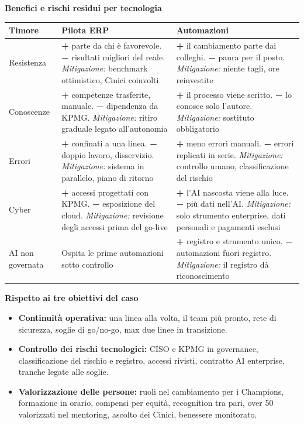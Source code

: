 \documentclass[11pt,a4paper]{article}
\begin{document}
\textbf{Benefici e rischi residui per tecnologia}

{\small\renewcommand{\arraystretch}{1.25}
\begin{xltabular}{\linewidth}{@{}>{\raggedright\arraybackslash{}\hsize\hspace{0pt}}X>{\raggedright\arraybackslash{}\hsize\hspace{0pt}}X>{\raggedright\arraybackslash{}\hsize\hspace{0pt}}X@{}}
\toprule
\textbf{Timore} & \textbf{Pilota ERP} & \textbf{Automazioni} \\
\midrule
\endhead
Resistenza & \textbf{+} parte da chi è favorevole. \textbf{−} risultati migliori del reale. \emph{Mitigazione:} benchmark ottimistico, Cinici coinvolti & \textbf{+} il cambiamento parte dai colleghi. \textbf{−} paura per il posto. \emph{Mitigazione:} niente tagli, ore reinvestite \\
Conoscenze & \textbf{+} competenze trasferite, manuale. \textbf{−} dipendenza da KPMG. \emph{Mitigazione:} ritiro graduale legato all'autonomia & \textbf{+} il processo viene scritto. \textbf{−} lo conosce solo l'autore. \emph{Mitigazione:} sostituto obbligatorio \\
Errori & \textbf{+} confinati a una linea. \textbf{−} doppio lavoro, disservizio. \emph{Mitigazione:} sistema in parallelo, piano di ritorno & \textbf{+} meno errori manuali. \textbf{−} errori replicati in serie. \emph{Mitigazione:} controllo umano, classificazione del rischio \\
Cyber & \textbf{+} accessi progettati con KPMG. \textbf{−} esposizione del cloud. \emph{Mitigazione:} revisione degli accessi prima del go-live & \textbf{+} l'AI nascosta viene alla luce. \textbf{−} più dati nell'AI. \emph{Mitigazione:} solo strumento enterprise, dati personali e pagamenti esclusi \\
AI non governata & Ospita le prime automazioni sotto controllo & \textbf{+} registro e strumento unico. \textbf{−} automazioni fuori registro. \emph{Mitigazione:} il registro dà riconoscimento \\
\bottomrule
\end{xltabular}}

\textbf{Rispetto ai tre obiettivi del caso}
\begin{itemize}
\item \textbf{Continuità operativa:} una linea alla volta, il team più pronto, rete di sicurezza, soglie di go/no-go, max due linee in transizione.
\item \textbf{Controllo dei rischi tecnologici:} CISO e KPMG in governance, classificazione del rischio e registro, accessi rivisti, contratto AI enterprise, tranche legate alle soglie.
\item \textbf{Valorizzazione delle persone:} ruoli nel cambiamento per i Champions, formazione in orario, compensi per equità, recognition tra pari, over 50 valorizzati nel mentoring, ascolto dei Cinici, benessere monitorato.
\end{itemize}
\end{document}
